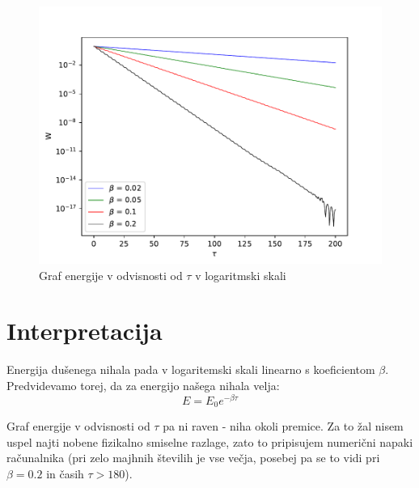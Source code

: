 \documentclass[11pt,a4paper]{article}
\begin{document}
\begin{figure}
  \begin{center}
  	\includegraphics[width=12cm]{graf2.pdf}
    \caption{Graf energije v odvisnosti od $\tau$ v logaritmski skali}
  \end{center}
\end{figure}

\vspace{2cm}

\section{Interpretacija}
Energija du\v senega nihala pada v logaritemski skali linearno s koeficientom $\beta$. Predvidevamo torej, da za energijo na\v sega nihala velja:
$$
E = E_0 e^{-\beta\tau}
$$

Graf energije v odvisnosti od $\tau$ pa ni raven - niha okoli premice. Za to \v zal nisem uspel najti nobene fizikalno smiselne razlage, zato to pripisujem numeri\v cni napaki ra\v cunalnika (pri zelo majhnih \v stevilih je vse ve\v cja, posebej pa se to vidi pri $\beta = 0.2$ in \v casih $ \tau > 180$).
\end{document}
